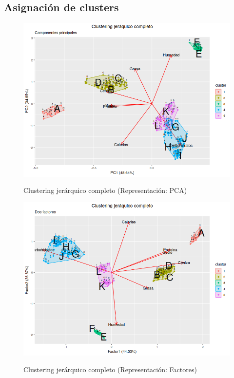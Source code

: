 \documentclass[pdf]{beamer}
\begin{document}
\subsection{Asignación de clusters}

\begin{frame}
\begin{figure}[h]
\centering
	\includegraphics[scale=.35]{images/clusterPCA.png} 
	\label{i_cluster_PCA}
	\caption{Clustering jerárquico completo (Representación: PCA)}
\end{figure}
\end{frame}

\begin{frame}
\begin{figure}[h]
\centering
	\includegraphics[scale=.35]{images/clusterFactores.png} 
	\label{i_cluster_Factores}
	\caption{Clustering jerárquico completo (Representación: Factores)}
\end{figure}
\end{frame}


\begin{frame}
\end{frame}
\end{document}
